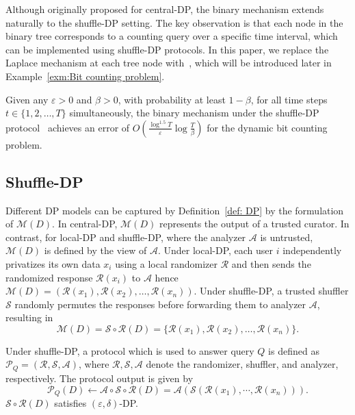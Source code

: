 Although originally proposed for central-DP, the binary mechanism extends naturally to the shuffle-DP setting. 
The key observation is that each node in the binary tree corresponds to a counting query over a specific time interval, which can be implemented using shuffle-DP protocols.
In this paper, we replace the Laplace mechanism at each tree node with~\cite{ghazi2021differentially}, which will be introduced later in Example~\ref{exm:Bit counting problem}.
\begin{lemma}
\label{lem:shuffle binary mechanism}
Given any $\varepsilon > 0$ and $\beta > 0$, with probability at least $1-\beta$, for all time steps $t \in \{1,2,\dots,T\}$ simultaneously,  the binary mechanism under the shuffle-DP protocol~\cite{ghazi2021differentially} achieves an error of $O(\tfrac{\log^{1.5}T}{\varepsilon}\log\tfrac{T}{\beta})$ for the dynamic bit counting problem.
\end{lemma}




\subsection{Shuffle-DP}
\label{sec:Shuffle-DP}
Different DP models can be captured by Definition~\ref{def: DP} by the formulation of $\mathcal{M}(D)$.
In central-DP, $\mathcal{M}(D)$ represents the output of a trusted curator. In contrast, for local-DP and shuffle-DP, where the analyzer $\mathcal{A}$ is untrusted, $\mathcal{M}(D)$ is defined by the view of $\mathcal{A}$.
Under local-DP, each user $i$ independently privatizes its own data $x_i$ using a local randomizer $\mathcal{R}$ and then sends the randomized response $\mathcal{R}(x_i)$ to $\mathcal{A}$ hence $\mathcal{M}(D)=(\mathcal{R}(x_1), \mathcal{R}(x_2), \dots, \mathcal{R}(x_n))$.
Under shuffle-DP, a trusted shuffler $\mathcal{S}$ randomly permutes the responses before forwarding them to analyzer $\mathcal{A}$, resulting in
\[\mathcal{M}(D) = \mathcal{S} \circ \mathcal{R} (D)= \{\mathcal{R}(x_1), \mathcal{R}(x_2), \dots, \mathcal{R}(x_n)\}.\]

Under shuffle-DP, a protocol which is used to answer query $Q$ is defined as $\mathcal{P}_Q = (\mathcal{R}, \mathcal{S}, \mathcal{A})$, where $\mathcal{R}, \mathcal{S}, \mathcal{A}$ denote the randomizer, shuffler, and analyzer, respectively. The protocol output is given by
\[\mathcal{P}_Q(D)\gets \mathcal{A} \circ \mathcal{S} \circ \mathcal{R} (D) = \mathcal{A}(\mathcal{S}(\mathcal{R}(x_1), \cdots, \mathcal{R}(x_n))).\]
$\mathcal{S} \circ \mathcal{R} (D)$ satisfies $(\varepsilon,\delta)$-DP. 


